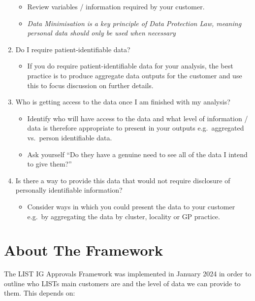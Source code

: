 \documentclass[
]{book}
\providecommand{\tightlist}{%
  \setlength{\itemsep}{0pt}\setlength{\parskip}{0pt}}
\begin{document}
\begin{enumerate}
  \begin{itemize}
  \tightlist
  \item
    Review variables / information required by your customer.
  \item
    \emph{Data Minimisation is a key principle of Data Protection Law, meaning personal data should only be used when necessary}
  \end{itemize}
\item
  Do I require patient-identifiable data?

  \begin{itemize}
  \tightlist
  \item
    If you do require patient-identifiable data for your analysis, the best practice is to produce aggregate data outputs for the customer and use this to focus discussion on further details.
  \end{itemize}
\item
  Who is getting access to the data once I am finished with my analysis?

  \begin{itemize}
  \tightlist
  \item
    Identify who will have access to the data and what level of information / data is therefore appropriate to present in your outputs e.g.~aggregated vs.~person identifiable data.\\
  \item
    Ask yourself ``Do they have a genuine need to see all of the data I intend to give them?''
  \end{itemize}
\item
  Is there a way to provide this data that would not require disclosure of personally identifiable information?

  \begin{itemize}
  \tightlist
  \item
    Consider ways in which you could present the data to your customer e.g.~by aggregating the data by cluster, locality or GP practice.
  \end{itemize}
\end{enumerate}

\hypertarget{about-the-framework}{%
\section{About The Framework}\label{about-the-framework}}

The LIST IG Approvals Framework was implemented in January 2024 in order to outline who LISTs main customers are and the level of data we can provide to them. This depends on:
\end{document}

